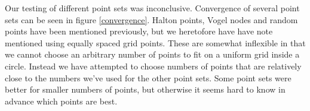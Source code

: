 \documentclass[12pt]{article}
\begin{document}
	Our testing of different point sets was inconclusive. Convergence of several point sets can be seen in figure \ref{convergence}. Halton points, Vogel nodes and random points have been mentioned previously, but we heretofore have have note mentioned using equally spaced grid points. These are somewhat inflexible in that we cannot choose an arbitrary number of points to fit on a uniform grid inside a circle. Instead we have attempted to choose numbers of points that are relatively close to the numbers we've used for the other point sets. Some point sets were better for smaller numbers of points, but otherwise it seems hard to know in advance which points are best.
	
	\newcommand{\convFigSize}{.45}
	\begin{figure}[hp]
		\centering
		\begin{tabular}{cc}

\end{tabular}
\end{figure}
\end{document}

